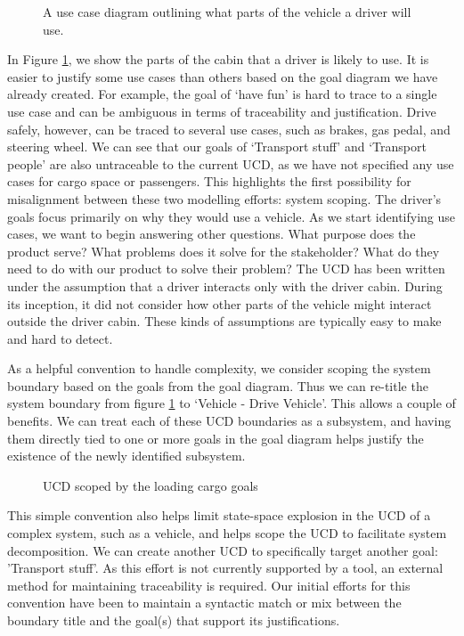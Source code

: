 \begin{figure}
	\centering
	
	\caption{A use case diagram outlining what parts of the vehicle a driver will use.}
	\label{fig:Driver_UCD}
\end{figure} 

In Figure \ref{fig:Driver_UCD}, we show the parts of the cabin that a driver is likely to use. It is easier to justify some use cases than others based on the goal diagram we have already created. For example, the goal of `have fun' is hard to trace to a single use case and can be ambiguous in terms of traceability and justification. Drive safely, however, can be traced to several use cases, such as brakes, gas pedal, and steering wheel. We can see that our goals of `Transport stuff' and `Transport people' are also untraceable to the current \gls{UCD}, as we have not specified any use cases for cargo space or passengers. This highlights the first possibility for misalignment between these two modelling efforts: system scoping. The driver's goals focus primarily on why they would use a vehicle. As we start identifying use cases, we want to begin answering other questions. What purpose does the product serve? What problems does it solve for the stakeholder? What do they need to do with our product to solve their problem? The \gls{UCD} has been written under the assumption that a driver interacts only with the driver cabin. During its inception, it did not consider how other parts of the vehicle might interact outside the driver cabin. These kinds of assumptions are typically easy to make and hard to detect. 

As a helpful convention to handle complexity, we consider scoping the system boundary based on the goals from the goal diagram. Thus we can re-title the system boundary from figure \ref{fig:Driver_UCD} to `Vehicle - Drive Vehicle'. This allows a couple of benefits. We can treat each of these \gls{UCD} boundaries as a subsystem, and having them directly tied to one or more goals in the goal diagram helps justify the existence of the newly identified subsystem.

\begin{figure}
	\centering
	
	\caption{\gls{UCD} scoped by the loading cargo goals}
	\label{fig:Cargo_UCD}
\end{figure}

This simple convention also helps limit state-space explosion in the \gls{UCD} of a complex system, such as a vehicle, and helps scope the \gls{UCD} to facilitate system decomposition. We can create another \gls{UCD} to specifically target another goal: 'Transport stuff'. As this effort is not currently supported by a tool, an external method for maintaining traceability is required. Our initial efforts for this convention have been to maintain a syntactic match or mix between the boundary title and the goal(s) that support its justifications.

